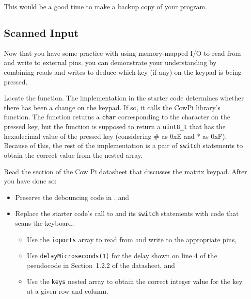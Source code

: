This would be a good time to make a backup copy of your program.


\subsection{Scanned Input} \label{subsec:ScannedInput}

Now that you have some practice with using memory-mapped I/O to read from and write to external pins, you can demonstrate your understanding by combining reads and writes to deduce which key (if any) on the keypad is being pressed.

Locate the  function.
The implementation in the starter code determines whether there has been a change on the keypad.
If so, it calls the CowPi library's  function.
The  function returns a \lstinline{char} corresponding to the character on the pressed key,
but the  function is supposed to return a \lstinline{uint8_t} that has the hexadecimal value of the pressed key (considering \# as 0xE and * as 0xF).
Because of this, the rest of the implementation is a pair of \lstinline{switch} statements to obtain the correct value from the  nested array.

Read the section of the Cow Pi datasheet that \href{https://cow-pi.readthedocs.io/en/latest/hardware/inputs.html#matrix-keypad}{discusses the matrix keypad}.
After you have done so:

\begin{itemize}
    \item Preserve the debouncing code in , and
    \item Replace the starter code's call to  and its \lstinline{switch} statements with code that scans the keyboard.
        \begin{itemize}
            \item Use the \lstinline{ioports} array to read from and write to the appropriate pins,
            \item Use \lstinline{delayMicroseconds(1)} for the delay shown on line 4 of the pseudocode in Section~1.2.2 of the datasheet, and
            \item Use the \lstinline{keys} nested array to obtain the correct integer value for the key at a given row and column.
        \end{itemize}
\end{itemize}

